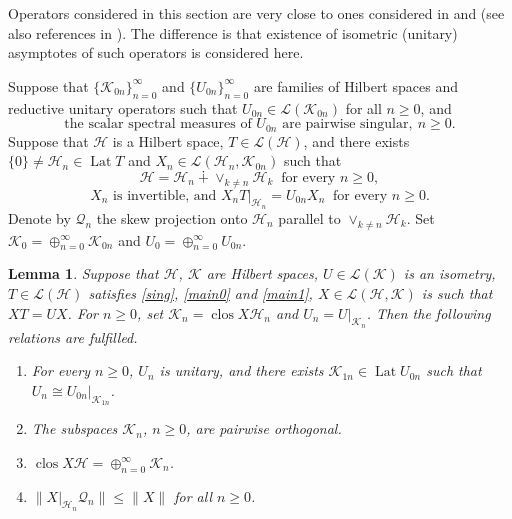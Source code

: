 \documentclass[a4paper,oneside,11pt]{amsart}
\numberwithin{equation}{section}
\theoremstyle{plain}
\newtheorem{lemma}[theorem]{Lemma}
\theoremstyle{definition}
\begin{document}
Operators considered in this section are very close to ones considered in \cite{apostol} and 
\cite{ker87} (see also references in \cite{ker87}).  The difference is that existence of isometric (unitary) asymptotes of such operators is considered here. 

Suppose that $\{\mathcal K_{0n}\}_{n=0}^\infty$ and $\{U_{0n}\}_{n=0}^\infty$ are families of Hilbert 
spaces and reductive unitary operators such that $U_{0n}\in\mathcal L(\mathcal K_{0n})$ for all $n\geq 0$, and 
\begin{equation}\label{sing}\text{the scalar spectral measures of }U_{0n}\text{  are pairwise singular}, \ n\geq 0. 
\end{equation}
Suppose that $\mathcal H$ is a Hilbert space,  $T\in  \mathcal L(\mathcal H)$, and there exists 
 $\{0\}\neq\mathcal H_n\in\operatorname{Lat}T$ and  $X_n\in\mathcal L(\mathcal H_n, \mathcal K_{0n})$ such that 
\begin{equation}\label{main0}\mathcal H=\mathcal H_n\dotplus\vee_{k\neq n}\mathcal H_k\  \text{ for every  } n\geq 0,  \end{equation}
\begin{equation}\label{main1} X_n \text{  is invertible, and } X_nT|_{\mathcal H_n}=U_{0n}X_n\  \text{ for every  } n\geq 0. \end{equation}
Denote by $\mathcal Q_n$ the skew projection onto $\mathcal H_n$ parallel to $ \vee_{k\neq n}\mathcal H_k$. 
 Set $\mathcal K_0=\oplus_{n=0}^\infty\mathcal K_{0n}$ and $U_0=\oplus_{n=0}^\infty U_{0n}$. 

\begin{lemma}\label{lem1} Suppose that $\mathcal H$, $\mathcal K$ are Hilbert spaces,  $U\in\mathcal L(\mathcal K)$ is an isometry,  
  $T\in  \mathcal L(\mathcal H)$ satisfies \eqref{sing}, \eqref{main0} and \eqref{main1}, $X\in\mathcal L(\mathcal H,\mathcal K)$ 
is such that $XT=UX$. For $n\geq 0$, set $\mathcal K_n=\operatorname{clos}X\mathcal H_n$ and $U_n=U|_{\mathcal K_n}$. Then 
the following relations are fulfilled.
 \begin{enumerate}[\upshape (i)]
\item For every $n\geq 0$, $U_n$ is unitary, and there exists  
$\mathcal K_{1n}\in\operatorname{Lat}U_{0n}$ such that $U_n\cong U_{0n}|_{\mathcal K_{1n}}$.
\item The subspaces $\mathcal K_n$, $n\geq 0$, are pairwise orthogonal. 
\item $\operatorname{clos}X\mathcal H=\oplus_{n=0}^\infty \mathcal K_n$. 
\item $ \|X|_{\mathcal H_n}\mathcal Q_n\|\leq\|X\|$ for all $n\geq 0$.
\end{enumerate}
\end{lemma}
\end{document}
